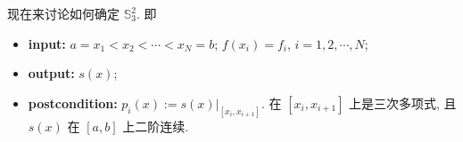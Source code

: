 \documentclass[a4paper]{ctexart}
\begin{document}


现在来讨论如何确定 $\mathbb{S}_3^2$. 即
\begin{itemize}
  \item {\bf input: } \newline 
  $a = x_1 < x_2 < \cdots < x_N = b$; \newline
  $f(x_i) = f_i$, $i = 1, 2, \cdots, N$;
  \item {\bf output: } \newline
  $s(x)$;
  \item {\bf postcondition: } \newline
  $p_i(x) := \left.s(x) \right|_{[x_i, x_{i + 1}]}. 
  $ 在 $[x_i, x_{i + 1}]$ 上是三次多项式, 且 \newline
  $s(x)$ 在 $[a, b]$ 上二阶连续.
\end{itemize}
\end{document}
